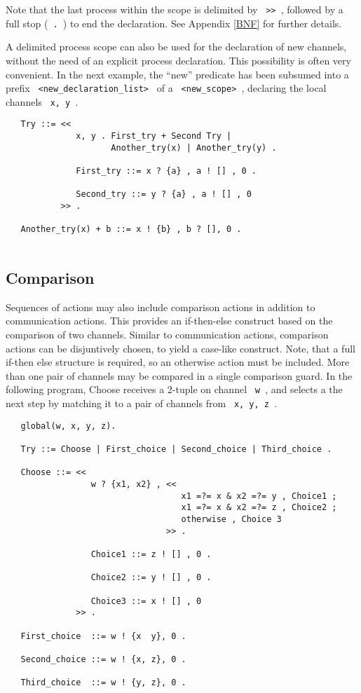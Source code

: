 Note that the last process within the scope is delimited by \verb+ >> +,
followed by a full stop (\verb+ . +) to end the declaration.  See
Appendix \ref{BNF} for further details.

A delimited process scope can also be used for the declaration of
new channels, without the need of an explicit process declaration.
This possibility is often very convenient. In the next example, the
``new'' predicate has been subsumed into a prefix
\verb+ <new_declaration_list> +
of a \verb+ <new_scope> +, declaring the local channels \verb+ x, y +.

\begin{verbatim}
   Try ::= <<
              x, y . First_try + Second Try |
                     Another_try(x) | Another_try(y) .

              First_try ::= x ? {a} , a ! [] , 0 .

              Second_try ::= y ? {a} , a ! [] , 0 
           >> .

   Another_try(x) + b ::= x ! {b} , b ? [], 0 .
 
\end{verbatim}

\subsection{Comparison}

Sequences of actions may also include comparison actions in
addition to communication actions. This provides an if-then-else construct
based on the comparison of two channels. Similar to communication
actions, comparison actions can be disjuntively chosen, to yield a
case-like construct. Note, that a full if-then else structure is
required, so an otherwise action must be included. More than one pair
of channels may be compared in a single comparison guard. In the following
program, Choose receives a 2-tuple on channel \verb+ w +, and selects a the
next step by matching it to a pair of channels from \verb+ x, y, z +.

\begin{verbatim}
   global(w, x, y, z).

   Try ::= Choose | First_choice | Second_choice | Third_choice .

   Choose ::= <<
                 w ? {x1, x2} , <<
                                   x1 =?= x & x2 =?= y , Choice1 ;
                                   x1 =?= x & x2 =?= z , Choice2 ;
                                   otherwise , Choice 3
                                >> .

                 Choice1 ::= z ! [] , 0 .

                 Choice2 ::= y ! [] , 0 . 

                 Choice3 ::= x ! [] , 0
              >> .
  
   First_choice  ::= w ! {x  y}, 0 .
          
   Second_choice ::= w ! {x, z}, 0 .

   Third_choice  ::= w ! {y, z}, 0 .  
 
\end{verbatim}


